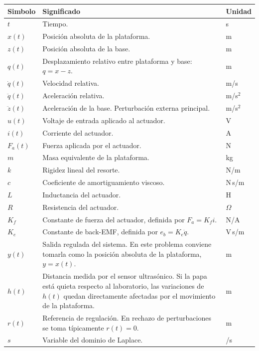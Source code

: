 \documentclass[11pt]{article}
\begin{document}
\renewcommand{\arraystretch}{1.2}
\begin{center}
\small
\begin{tabular}{>{\raggedright\arraybackslash}p{2.6cm} >{\raggedright\arraybackslash}p{9.6cm} >{\raggedright\arraybackslash}p{2.0cm}}
\toprule
\textbf{Simbolo} & \textbf{Significado} & \textbf{Unidad} \\
\midrule
$t$ & Tiempo. & s \\
$x(t)$ & Posici\'on absoluta de la plataforma. & m \\
$z(t)$ & Posici\'on absoluta de la base. & m \\
$q(t)$ & Desplazamiento relativo entre plataforma y base: $q=x-z$. & m \\
$\dot q(t)$ & Velocidad relativa. & m/s \\
$\ddot q(t)$ & Aceleraci\'on relativa. & m/s$^2$ \\
$\ddot z(t)$ & Aceleraci\'on de la base. Perturbaci\'on externa principal. & m/s$^2$ \\
$u(t)$ & Voltaje de entrada aplicado al actuador. & V \\
$i(t)$ & Corriente del actuador. & A \\
$F_a(t)$ & Fuerza aplicada por el actuador. & N \\
$m$ & Masa equivalente de la plataforma. & kg \\
$k$ & Rigidez lineal del resorte. & N/m \\
$c$ & Coeficiente de amortiguamiento viscoso. & N\,s/m \\
$L$ & Inductancia del actuador. & H \\
$R$ & Resistencia del actuador. & $\Omega$ \\
$K_f$ & Constante de fuerza del actuador, definida por $F_a=K_f i$. & N/A \\
$K_e$ & Constante de back-EMF, definida por $e_b=K_e\dot q$. & V\,s/m \\
$y(t)$ & Salida regulada del sistema. En este problema conviene tomarla como la posici\'on absoluta de la plataforma, $y=x(t)$. & m \\
$h(t)$ & Distancia medida por el sensor ultras\'onico. Si la papa est\'a quieta respecto al laboratorio, las variaciones de $h(t)$ quedan directamente afectadas por el movimiento de la plataforma. & m \\
$r(t)$ & Referencia de regulaci\'on. En rechazo de perturbaciones se toma t\'ipicamente $r(t)=0$. & m \\
$s$ & Variable del dominio de Laplace. & 1/s \\
\bottomrule
\end{tabular}
\end{center}
\end{document}
